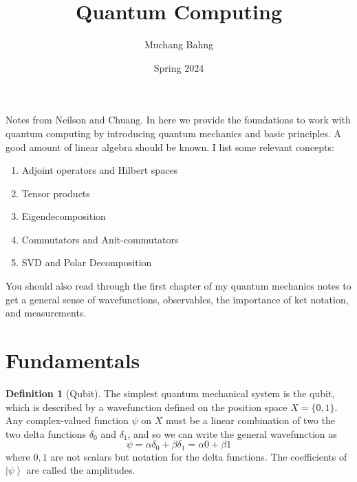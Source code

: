\documentclass{article}
\newcommand{\ket}[1]{\ensuremath{\left|#1\right\rangle}}
\theoremstyle{definition}
\newtheorem{definition}{Definition}[section]
\begin{document}
\pagestyle{fancy}

\cfoot{\thepage / \pageref{LastPage}}

\title{Quantum Computing}
\author{Muchang Bahng}
\date{Spring 2024}

\maketitle
\tableofcontents
\pagebreak 

Notes from Neilson and Chuang. 
In here we provide the foundations to work with quantum computing by introducing quantum mechanics and basic principles. A good amount of linear algebra should be known. I list some relevant concepts: 
\begin{enumerate}
  \item Adjoint operators and Hilbert spaces 
  \item Tensor products
  \item Eigendecomposition 
  \item Commutators and Anit-commutators 
  \item SVD and Polar Decomposition 
\end{enumerate}

You should also read through the first chapter of my quantum mechanics notes to get a general sense of wavefunctions, observables, the importance of ket notation, and measurements. 



\section{Fundamentals}

  \begin{definition}[Qubit]
    The simplest quantum mechanical system is the qubit, which is described by a wavefunction defined on the position space $X = \{0, 1\}$. Any complex-valued function $\psi$ on $X$ must be a linear combination of two the two delta functions $\delta_0$ and $\delta_1$, and so we can write the general wavefunction as \begin{equation} 
      \psi = \alpha \delta_0 + \beta \delta_1 = \alpha 0 + \beta 1
    \end{equation} 
    where $0, 1$ are not scalars but notation for the delta functions. The coefficients of $\ket{\psi}$ are called the amplitudes. 
  \end{definition}
\end{document}
